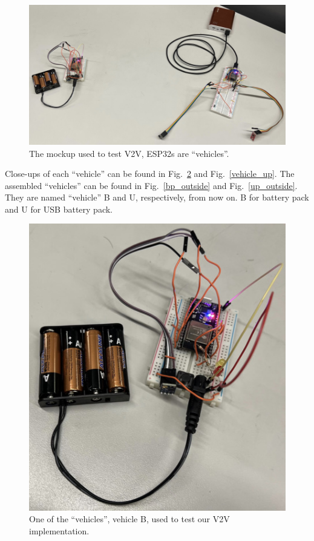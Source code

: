 \documentclass[conference]{IEEEtran}
\begin{document}
\begin{figure}[htbp]
\centerline{\includegraphics[width=\linewidth]{pics/two_boards.jpg}}
\caption{The mockup used to test V2V, ESP32s are ``vehicles''.}
\label{mockup}
\end{figure}

Close-ups of each ``vehicle'' can be found in Fig.~\ref{vehicle_bp} and
Fig.~\ref{vehicle_up}. The assembled ``vehicles'' can be found in
Fig.~\ref{bp_outside} and Fig.~\ref{up_outside}. They are named ``vehicle'' B
and U, respectively, from now on. B for battery pack and U for USB battery pack.

\begin{figure}[htbp]
\centerline{\includegraphics[width=\linewidth]{pics/bp_internals.jpg}}
\caption{One of the ``vehicles'', vehicle B, used to test our V2V implementation.}
\label{vehicle_bp}
\end{figure}
\end{document}
